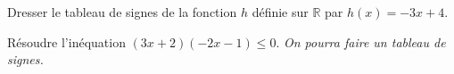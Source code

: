 \documentclass[11pt]{article}
\begin{document}
\begin{app}
  Dresser le tableau de signes de la fonction $h$ définie sur $\mathbb{R}$ par
  $h(x)=-3x+4$.
\end{app}

\begin{app}
  Résoudre l'inéquation $(3x+2)(-2x-1)\leq 0$. \emph{On pourra faire un tableau
  de signes.}
\end{app}
\end{document}
